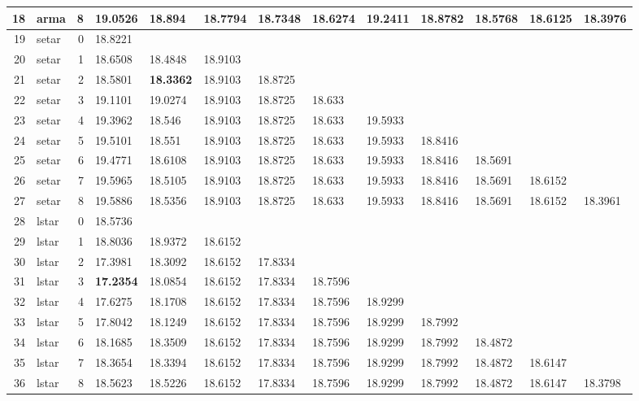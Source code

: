 \documentclass[10pt,a4paper]{article}
\begin{document}
\begin{table}[ht]
\begin{tabular}{rlrllllllllll}
  18 & arma &     8 & 19.0526 & 18.894 & 18.7794 & 18.7348 & 18.6274 & 19.2411 & 18.8782 & 18.5768 & 18.6125 & 18.3976 \\ 
   \hline
19 & setar &     0 & 18.8221 &  &  &  &  &  &  &  &  &  \\ 
  20 & setar &     1 & 18.6508 & 18.4848 & 18.9103 &  &  &  &  &  &  &  \\ 
  21 & setar &     2 & 18.5801 & \textbf{18.3362} & 18.9103 & 18.8725 &  &  &  &  &  &  \\ 
  22 & setar &     3 & 19.1101 & 19.0274 & 18.9103 & 18.8725 & 18.633 &  &  &  &  &  \\ 
  23 & setar &     4 & 19.3962 & 18.546 & 18.9103 & 18.8725 & 18.633 & 19.5933 &  &  &  &  \\ 
  24 & setar &     5 & 19.5101 & 18.551 & 18.9103 & 18.8725 & 18.633 & 19.5933 & 18.8416 &  &  &  \\ 
  25 & setar &     6 & 19.4771 & 18.6108 & 18.9103 & 18.8725 & 18.633 & 19.5933 & 18.8416 & 18.5691 &  &  \\ 
  26 & setar &     7 & 19.5965 & 18.5105 & 18.9103 & 18.8725 & 18.633 & 19.5933 & 18.8416 & 18.5691 & 18.6152 &  \\ 
  27 & setar &     8 & 19.5886 & 18.5356 & 18.9103 & 18.8725 & 18.633 & 19.5933 & 18.8416 & 18.5691 & 18.6152 & 18.3961 \\ 
   \hline
28 & lstar &     0 & 18.5736 &  &  &  &  &  &  &  &  &  \\ 
  29 & lstar &     1 & 18.8036 & 18.9372 & 18.6152 &  &  &  &  &  &  &  \\ 
  30 & lstar &     2 & 17.3981 & 18.3092 & 18.6152 & 17.8334 &  &  &  &  &  &  \\ 
  31 & lstar &     3 & \textbf{17.2354} & 18.0854 & 18.6152 & 17.8334 & 18.7596 &  &  &  &  &  \\ 
  32 & lstar &     4 & 17.6275 & 18.1708 & 18.6152 & 17.8334 & 18.7596 & 18.9299 &  &  &  &  \\ 
  33 & lstar &     5 & 17.8042 & 18.1249 & 18.6152 & 17.8334 & 18.7596 & 18.9299 & 18.7992 &  &  &  \\ 
  34 & lstar &     6 & 18.1685 & 18.3509 & 18.6152 & 17.8334 & 18.7596 & 18.9299 & 18.7992 & 18.4872 &  &  \\ 
  35 & lstar &     7 & 18.3654 & 18.3394 & 18.6152 & 17.8334 & 18.7596 & 18.9299 & 18.7992 & 18.4872 & 18.6147 &  \\ 
  36 & lstar &     8 & 18.5623 & 18.5226 & 18.6152 & 17.8334 & 18.7596 & 18.9299 & 18.7992 & 18.4872 & 18.6147 & 18.3798 \\ 

\end{tabular}
\end{table}
\end{document}
